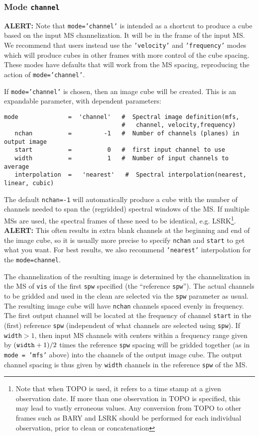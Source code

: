 \subsubsection{Mode {\tt channel} }
\label{section:im.pars.mode.channel}

{\bf ALERT:} Note that {\tt mode='channel'} is intended as a shortcut
to produce a cube based on the input MS channelization.  It will be in
the frame of the input MS.  We recommend that users instead use the
{\tt 'velocity'} and {\tt 'frequency'} modes which will produce cubes
in other frames with more control of the cube spacing.  These modes
have defaults that will work from the MS spacing, reproducing the
action of {\tt mode='channel'}.

If {\tt mode='channel'} is chosen, then an image cube will be
created. This is an expandable parameter, with dependent parameters:
\small
\begin{verbatim}
mode              =  'channel'   #  Spectral image definition(mfs,
                                 #   channel, velocity,frequency)
   nchan          =         -1   #  Number of channels (planes) in output image
   start          =          0   #  first input channel to use
   width          =          1   #  Number of input channels to average
   interpolation  =   'nearest'   #  Spectral interpolation(nearest, linear, cubic)
\end{verbatim}
\normalsize The default {\tt nchan=-1} will automatically produce a
cube with the number of channels needed to span the (regridded)
spectral windows of the MS. If multiple MSs are used, the spectral
frames of these need to be identical, e.g. LSRK\footnote{Note that
  when TOPO is used, it refers to a time stamp at a given observation date. If
more than one observation in TOPO is specified, this may lead to vastly
erroneous values. Any conversion from TOPO to other frames such as
BARY and LSRK should be performed for each individual observation,
prior to clean or concatenation}.  {\bf ALERT:} This
often results in extra blank channels at the beginning and end of the
image cube, so it is usually more precise to specify {\tt nchan} and
{\tt start} to get what you want. For best results, we also recommend
{\tt 'nearest'} interpolation for the {\tt mode=channel}.

The channelization of the resulting image is determined by the
channelization in the MS of {\tt vis} of the first {\tt spw} specified
(the ``reference {\tt spw}''). The actual channels to be gridded and
used in the clean are selected via the {\tt spw} parameter as usual.
The resulting image cube will have {\tt nchan} channels spaced evenly
in frequency.  The first output channel will be located at the
frequency of channel {\tt start} in the (first) reference {\tt spw}
(independent of what channels are selected using {\tt spw}).  If {\tt
  width}$ > 1$, then input MS channels with centers within a frequency
range given by $({\tt width}+1)/2$ times the reference {\tt spw}
spacing will be gridded together (as in {\tt mode = 'mfs'} above) into
the channels of the output image cube.  The output channel spacing is
thus given by {\tt width} channels in the reference {\tt spw} of the
MS.
  
